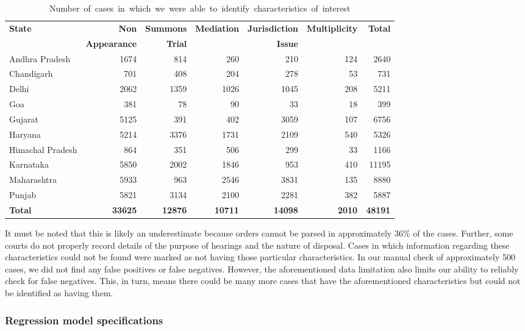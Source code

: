 {\footnotesize \centering
  \begin{longtable}{@{}lrrrrrr@{}}
  \caption{\mbox{Number of cases in which we were able to identify
    characteristics of interest}}
  \label{tab:case_chars}\\
  \toprule
  \textbf{State} & \textbf{Non} & \textbf{Summons} & \textbf{Mediation} & \textbf{Jurisdiction} & \textbf{Multiplicity} & \textbf{Total} \\
   & \textbf{Appearance} & \textbf{Trial} & & \textbf{Issue} & & \\
  \midrule
  \endhead
  Andhra Pradesh & 1674 & 814 & 260 & 210 & 124 & 2640 \\
  Chandigarh & 701 & 408 & 204 & 278 & 53 & 731 \\
  Delhi & 2062 & 1359 & 1026 & 1045 & 208 & 5211 \\
  Goa & 381 & 78 & 90 & 33 & 18 & 399 \\
  Gujarat & 5125 & 391 & 402 & 3059 & 107 & 6756 \\
  Haryana & 5214 & 3376 & 1731 & 2109 & 540 & 5326 \\
  Himachal Pradesh & 864 & 351 & 506 & 299 & 33 & 1166 \\
  Karnataka & 5850 & 2002 & 1846 & 953 & 410 & 11195 \\
  Maharashtra & 5933 & 963 & 2546 & 3831 & 135 & 8880 \\
  Punjab & 5821 & 3134 & 2100 & 2281 & 382 & 5887 \\
  \midrule
  \textbf{Total} & \textbf{33625} & \textbf{12876} & \textbf{10711} &
  \textbf{14098} & \textbf{2010} & \textbf{48191}\\\bottomrule
\end{longtable}
}

It must be noted that this is likely an underestimate because orders cannot be parsed in approximately 36\% of the cases. Further, some courts do not properly record details of the purpose of hearings and the nature of disposal. Cases in which information regarding these characteristics could not be found were marked as not having those particular characteristics. In our manual check of approximately 500 cases, we did not find any false positives or false negatives. However, the aforementioned data limitation also limits our ability to reliably check for false negatives. This, in turn, means there could be many more cases that have the aforementioned characteristics but could not be identified as having them.

\subsubsection{Regression model specifications}
\label{sec:model-selection}


